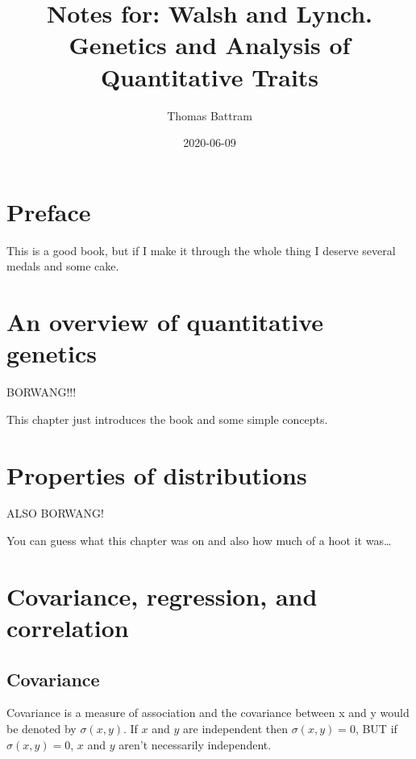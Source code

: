 \documentclass[
]{book}
\title{Notes for: Walsh and Lynch. Genetics and Analysis of Quantitative Traits}
\author{Thomas Battram}
\date{2020-06-09}
\begin{document}
\maketitle

{
\setcounter{tocdepth}{1}
\tableofcontents
}
\hypertarget{preface}{%
\chapter*{Preface}\label{preface}}

This is a good book, but if I make it through the whole thing I deserve several medals and some cake.

\hypertarget{an-overview-of-quantitative-genetics}{%
\chapter{An overview of quantitative genetics}\label{an-overview-of-quantitative-genetics}}

BORWANG!!!

This chapter just introduces the book and some simple concepts.

\hypertarget{properties-of-distributions}{%
\chapter{Properties of distributions}\label{properties-of-distributions}}

ALSO BORWANG!

You can guess what this chapter was on and also how much of a hoot it was\ldots{}

\hypertarget{covariance-regression-and-correlation}{%
\chapter{Covariance, regression, and correlation}\label{covariance-regression-and-correlation}}

\hypertarget{covariance}{%
\section{Covariance}\label{covariance}}

Covariance is a measure of association and the covariance between x and y would be denoted by \(\sigma(x, y)\). If \(x\) and \(y\) are independent then \(\sigma(x, y) = 0\), BUT if \(\sigma(x, y) = 0\), \(x\) and \(y\) aren't necessarily independent.
\end{document}
